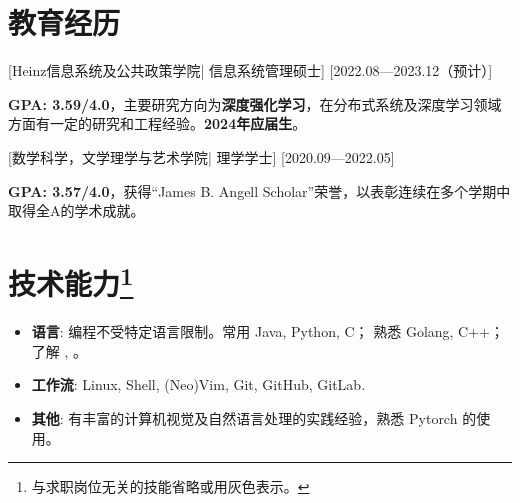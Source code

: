 \documentclass{resume}
\begin{document}


\ResumeTitle


\section{教育经历}
[\textnormal{Heinz信息系统及公共政策学院|}  信息系统管理硕士]
[2022.08—2023.12（预计）]

\textbf{GPA: 3.59/4.0}，主要研究方向为\textbf{深度强化学习}，在分布式系统及深度学习领域方面有一定的研究和工程经验。\textbf{2024年应届生}。


[\textnormal{数学科学，文学理学与艺术学院|} 理学学士]
[2020.09—2022.05]

\textbf{GPA: 3.57/4.0}，获得“James B. Angell Scholar”荣誉，以表彰连续在多个学期中取得全A的学术成就。

\section[技术能力]{技术能力\protect\footnote{与求职岗位无关的技能省略或用灰色表示。}}
\begin{itemize}
  \item \textbf{语言}: 编程不受特定语言限制。常用 Java, Python, C； 熟悉 Golang, C++；了解 , 。
  \item \textbf{工作流}: Linux, Shell, (Neo)Vim, Git, GitHub, GitLab.
  \item \textbf{其他}: 有丰富的计算机视觉及自然语言处理的实践经验，熟悉 Pytorch 的使用。
\end{itemize}
\end{document}
